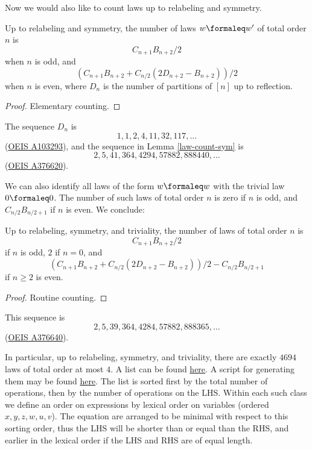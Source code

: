Now we would also like to count laws up to relabeling and symmetry.

\begin{lemma}\label{law-count-sym} Up to relabeling and symmetry, the number of laws $w \formaleq w'$ of total order $n$ is
$$ C_{n+1} B_{n+2}/2$$
when $n$ is odd, and
$$ (C_{n+1} B_{n+2} + C_{n/2} (2D_{n+2} - B_{n+2}))/2$$
when $n$ is even, where $D_n$ is the number of partitions of $[n]$ up to reflection.
\end{lemma}

\begin{proof} Elementary counting.
\end{proof}

The sequence $D_n$ is
$$ 1, 1, 2, 4, 11, 32, 117, \dots$$
(\href{https://oeis.org/A103293}{OEIS A103293}), and the sequence in Lemma \ref{law-count-sym} is
$$ 2, 5, 41, 364, 4294, 57882, 888440, \dots$$
(\href{https://oeis.org/A376620}{OEIS A376620}).

We can also identify all laws of the form $w \formaleq w$ with the trivial law $0 \formaleq 0$.  The number of such laws of total order $n$ is zero if $n$ is odd, and $C_{n/2} B_{n/2+1}$ if $n$ is even.  We conclude:

\begin{lemma}  Up to relabeling, symmetry, and triviality, the number of laws of total order $n$ is
$$ C_{n+1} B_{n+2}/2$$
if $n$ is odd, $2$ if $n = 0$, and
$$ (C_{n+1} B_{n+2} + C_{n/2} (2D_{n+2} - B_{n+2}))/2 - C_{n/2} B_{n/2+1}$$
if $n \geq 2$ is even.
\end{lemma}

\begin{proof} Routine counting.
\end{proof}

This sequence is
$$2, 5, 39, 364, 4284, 57882, 888365, \dots$$
(\href{https://oeis.org/A376640}{OEIS A376640}).

In particular, up to relabeling, symmetry, and triviality, there are exactly $4694$ laws of total order at most $4$.  A list can be found \href{https://github.com/teorth/equational_theories/blob/main/data/equations.txt}{here}.  A script for generating them may be found \href{https://github.com/teorth/equational_theories/blob/main/scripts/generate_eqs_list.py}{here}.  The list is sorted first by the total number of operations, then by the number of operations on the LHS. Within each such class we define an order on expressions by lexical order on variables (ordered $x, y, z, w, u, v$).  The equation are arranged to be minimal with respect to this sorting order, thus the LHS will be shorter than or equal than the RHS, and earlier in the lexical order if the LHS and RHS are of equal length.
